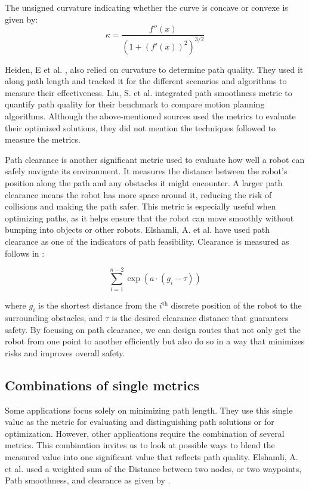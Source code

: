 The unsigned curvature indicating whether the curve is concave or convexe is given by:
\begin{equation}
    \kappa = \frac{f''(x)}{\left(1 + \left(f'(x)\right)^2\right)^{3/2}}
\end{equation}

Heiden, E et al. \cite{R23}, also relied on curvature to determine path quality. They used it along 
path length and tracked it for the different scenarios and algorithms to measure their effectiveness.
Liu, S. et al. integrated path smoothness metric to quantify path quality for their benchmark to compare
motion planning algorithms\cite{R35}.
Although the above-mentioned sources used the metrics to evaluate their optimized solutions,
they did not mention the techniques  followed to measure the metrics.

Path clearance is another significant metric used to evaluate how well a robot can safely navigate 
its environment. It measures the distance between the robot's position along the path and any obstacles 
it might encounter. A larger path clearance means the robot has more space around it, reducing the risk 
of collisions and making the path safer. This metric is especially useful when optimizing paths, as it 
helps ensure that the robot can move smoothly without bumping into objects or other robots. 
Elshamli, A. et al. \cite{R17} have used path clearance as one of the indicators of path feasibility.
Clearance is measured as follows in :

\begin{equation}
    \sum_{i=1}^{n-2} \exp\left(a \cdot (g_i - \tau)\right)
    \label{clear}
\end{equation}

where \(g_i\) is the shortest distance from the \(i^{\text{th}}\) discrete position of the 
robot to the surrounding obstacles, and \(\tau\) is the desired clearance distance that 
guarantees safety. By focusing 
on path clearance, we can design routes that not only get the robot from one point to another efficiently 
but also do so in a way that minimizes risks and improves overall safety.

\subsection{Combinations of single metrics}

Some applications focus solely on minimizing path length. They use this single value as the 
metric for evaluating and distinguishing path solutions or for optimization. However, other 
applications require the combination of several metrics. This combination invites us to look 
at possible ways to blend the measured value into one significant value that reflects path quality.
Elshamli, A. et al. \cite{R17} used a weighted sum of the Distance between two nodes, or two waypoints,
Path smoothness, and clearance as given by . 

